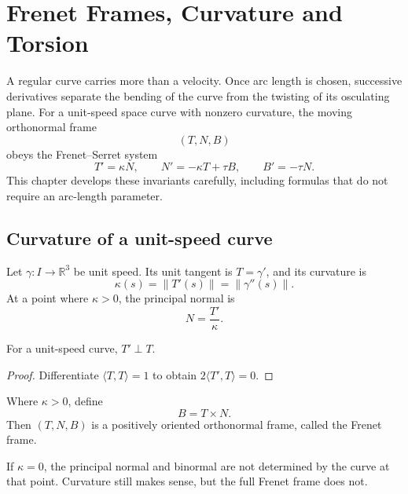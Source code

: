 \chapter{Frenet Frames, Curvature and Torsion}
\label{ch:vii13-frenet-frames-curvature-and-torsion}

A regular curve carries more than a velocity.  Once arc length is chosen, successive derivatives separate the bending of the curve from the twisting of its osculating plane.  For a unit-speed space curve with nonzero curvature, the moving orthonormal frame
\[
(T,N,B)
\]
obeys the Frenet--Serret system
\[
\boxed{T'=\kappa N,\qquad N'=-\kappa T+\tau B,\qquad B'=-\tau N.}
\]
This chapter develops these invariants carefully, including formulas that do not require an arc-length parameter.

\section{Curvature of a unit-speed curve}
\begin{definition}[Curvature]\label{def:vii13-curvature}
Let \(\gamma:I\to\mathbb R^3\) be unit speed.  Its unit tangent is \(T=\gamma'\), and its curvature is
\[
\kappa(s)=\|T'(s)\|=\|\gamma''(s)\|.
\]
At a point where \(\kappa>0\), the principal normal is
\[
N=\frac{T'}{\kappa}.
\]
\end{definition}

\begin{proposition}\label{prop:vii13-acc-normal}
For a unit-speed curve, \(T'\perp T\).
\end{proposition}
\begin{proof}
Differentiate \(\langle T,T\rangle=1\) to obtain \(2\langle T',T\rangle=0\).
\end{proof}

\begin{definition}\label{def:vii13-binormal}
Where \(\kappa>0\), define
\[
B=T\times N.
\]
Then \((T,N,B)\) is a positively oriented orthonormal frame, called the Frenet frame.
\end{definition}

\begin{warning}\label{warn:vii13-straight-points}
If \(\kappa=0\), the principal normal and binormal are not determined by the curve at that point.  Curvature still makes sense, but the full Frenet frame does not.
\end{warning}

